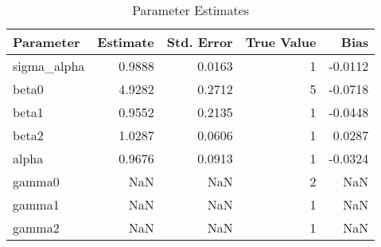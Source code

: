 \begin{table}
\caption{Parameter Estimates}
\begin{tabular}{lrrrr}
\toprule
Parameter & Estimate & Std. Error & True Value & Bias \\
\midrule
sigma_alpha & 0.9888 & 0.0163 & 1 & -0.0112 \\
beta0 & 4.9282 & 0.2712 & 5 & -0.0718 \\
beta1 & 0.9552 & 0.2135 & 1 & -0.0448 \\
beta2 & 1.0287 & 0.0606 & 1 & 0.0287 \\
alpha & 0.9676 & 0.0913 & 1 & -0.0324 \\
gamma0 & NaN & NaN & 2 & NaN \\
gamma1 & NaN & NaN & 1 & NaN \\
gamma2 & NaN & NaN & 1 & NaN \\
\bottomrule
\end{tabular}
\end{table}
